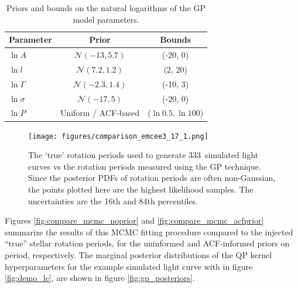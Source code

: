\documentclass[useAMS, usenatbib, preprint, 12pt]{aastex}
\newcommand{\naigrain}{333}
\begin{document}
\begin{table}
\begin{center}
\caption{Priors and bounds on the natural logarithms of the GP model parameters.}
\begin{tabular}{lcc}
Parameter & Prior & Bounds\\
    \hline
    $\ln A$ & $\mathcal N(-13, 5.7)$ & (-20, 0) \\
    $\ln l$ & $\mathcal N(7.2, 1.2)$ & (2, 20) \\
    $\ln \Gamma$ & $\mathcal N(-2.3, 1.4)$ & (-10, 3) \\
    $\ln \sigma$ & $\mathcal N(-17, 5)$ & (-20, 0) \\
    $\ln P $ & Uniform / ACF-based & ($\ln 0.5, \ln 100$) \\ 
\end{tabular}
\end{center}
\end{table}
\label{tab:priors}


\begin{figure}
\begin{center}
\texttt{[image: figures/comparison\_emcee3\_17\_1.png]}
\caption{The `true' rotation periods used to generate \naigrain\
simulated light curves vs the rotation periods measured using the GP
technique.
Since the posterior PDFs of rotation periods are often non-Gaussian,
the points plotted here are the highest likelihood samples.
The uncertainties are the 16th and 84th percentiles.}
\label{fig:compare_mcmc}
\end{center}
\end{figure}

Figures \ref{fig:compare_mcmc_noprior} and \ref{fig:compare_mcmc_acfprior} 
summarize the results of this MCMC fitting 
procedure compared to the injected ``true'' stellar rotation periods, for the 
uninformed and ACF-informed priors on period, respectively.
The marginal posterior distributions of the QP kernel hyperparameters for the
example simulated light curve with in figure \ref{fig:demo_lc}, are shown in
figure \ref{fig:gp_posteriors}.
\end{document}
